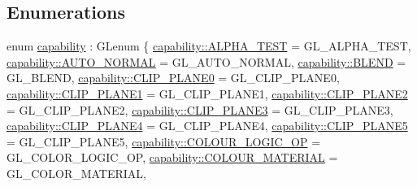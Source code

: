 \subsection*{Enumerations}
\begin{DoxyCompactItemize}
\item 
enum \hyperlink{namespaceglpp_a1b0f7d2f17d11ae11a12d44571612832}{capability} \+: G\+Lenum \{ \newline
\hyperlink{namespaceglpp_a1b0f7d2f17d11ae11a12d44571612832aa209f93fb20c33b9223bf875983d0a76}{capability\+::\+A\+L\+P\+H\+A\+\_\+\+T\+E\+ST} = G\+L\+\_\+\+A\+L\+P\+H\+A\+\_\+\+T\+E\+ST, 
\hyperlink{namespaceglpp_a1b0f7d2f17d11ae11a12d44571612832a3bbb2070620d0d5f18108fc5f7fc8ec6}{capability\+::\+A\+U\+T\+O\+\_\+\+N\+O\+R\+M\+AL} = G\+L\+\_\+\+A\+U\+T\+O\+\_\+\+N\+O\+R\+M\+AL, 
\hyperlink{namespaceglpp_a1b0f7d2f17d11ae11a12d44571612832af58072a9536aaeef0196115e445fa4d8}{capability\+::\+B\+L\+E\+ND} = G\+L\+\_\+\+B\+L\+E\+ND, 
\hyperlink{namespaceglpp_a1b0f7d2f17d11ae11a12d44571612832a4932be75aaa1eaf8f060ece124f57fe9}{capability\+::\+C\+L\+I\+P\+\_\+\+P\+L\+A\+N\+E0} = G\+L\+\_\+\+C\+L\+I\+P\+\_\+\+P\+L\+A\+N\+E0, 
\newline
\hyperlink{namespaceglpp_a1b0f7d2f17d11ae11a12d44571612832a05655d948a53df5b0eab1a0117abaa2d}{capability\+::\+C\+L\+I\+P\+\_\+\+P\+L\+A\+N\+E1} = G\+L\+\_\+\+C\+L\+I\+P\+\_\+\+P\+L\+A\+N\+E1, 
\hyperlink{namespaceglpp_a1b0f7d2f17d11ae11a12d44571612832a78508bb6632ee0da84bfdd6b449a01d7}{capability\+::\+C\+L\+I\+P\+\_\+\+P\+L\+A\+N\+E2} = G\+L\+\_\+\+C\+L\+I\+P\+\_\+\+P\+L\+A\+N\+E2, 
\hyperlink{namespaceglpp_a1b0f7d2f17d11ae11a12d44571612832a7898300f74d99772adb2fcd3946eae2c}{capability\+::\+C\+L\+I\+P\+\_\+\+P\+L\+A\+N\+E3} = G\+L\+\_\+\+C\+L\+I\+P\+\_\+\+P\+L\+A\+N\+E3, 
\hyperlink{namespaceglpp_a1b0f7d2f17d11ae11a12d44571612832ad892d581b89e6e7849d4b3747346492f}{capability\+::\+C\+L\+I\+P\+\_\+\+P\+L\+A\+N\+E4} = G\+L\+\_\+\+C\+L\+I\+P\+\_\+\+P\+L\+A\+N\+E4, 
\newline
\hyperlink{namespaceglpp_a1b0f7d2f17d11ae11a12d44571612832a7e425ab1a47a397ebe657f9c51d9ca64}{capability\+::\+C\+L\+I\+P\+\_\+\+P\+L\+A\+N\+E5} = G\+L\+\_\+\+C\+L\+I\+P\+\_\+\+P\+L\+A\+N\+E5, 
\hyperlink{namespaceglpp_a1b0f7d2f17d11ae11a12d44571612832a3bd4a3934d9c4fd497f4aeda64a88e52}{capability\+::\+C\+O\+L\+O\+U\+R\+\_\+\+L\+O\+G\+I\+C\+\_\+\+OP} = G\+L\+\_\+\+C\+O\+L\+O\+R\+\_\+\+L\+O\+G\+I\+C\+\_\+\+OP, 
\hyperlink{namespaceglpp_a1b0f7d2f17d11ae11a12d44571612832a7d4824cfec774b1c57d6c9667e256a08}{capability\+::\+C\+O\+L\+O\+U\+R\+\_\+\+M\+A\+T\+E\+R\+I\+AL} = G\+L\+\_\+\+C\+O\+L\+O\+R\+\_\+\+M\+A\+T\+E\+R\+I\+AL, 

\end{DoxyCompactItemize}
